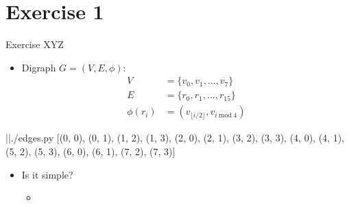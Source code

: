 
\section{Exercise 1}

\setcounter{exercise}{1}

\begin{frame}{Exercise \thesection}{XYZ\vspace{0.5cm}}
  \begin{exercisenoinc}
    \begin{itemize}
      \item Digraph $G=\left(V,E,\phi\right)$:
      \begin{align*}
        V &= \{v_0, v_1, ..., v_7\} \\
        E &= \{r_0, r_1, ..., r_{15} \} \\
        \phi(r_i) &= (v_{\lfloor i / 2\rfloor}, v_{i \; \text{mod} \; 4})
      \end{align*}
    \end{itemize}
  \end{exercisenoinc}
  \begin{requirementsnoinc}
    \centering
    \begin{minipage}{0.6\textwidth}
      \begin{linenums}
      \end{linenums}
    \end{minipage}
    \begin{terminal}
      |\prompt|./edges.py
      [(0, 0), (0, 1), (1, 2), (1, 3), (2, 0), (2, 1), (3, 2), (3, 3), 
       (4, 0), (4, 1), (5, 2), (5, 3), (6, 0), (6, 1), (7, 2), (7, 3)]
    \end{terminal}
  \end{requirementsnoinc}
  \begin{solution}
  \end{solution}
  \begin{solutionnoinc}
    \begin{itemize}
      \item Is it simple?
      \begin{itemize}
        \item[]

\end{itemize}
\end{itemize}
\end{solutionnoinc}
\end{frame}
